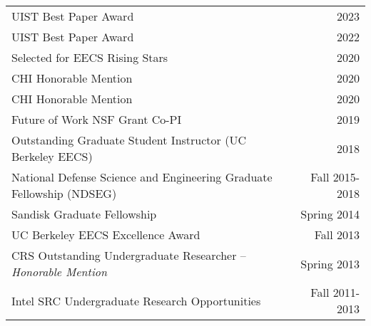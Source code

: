 \begin{longtable}{Xr}
	UIST Best Paper Award & 2023 \\
	UIST Best Paper Award & 2022 \\
	Selected for EECS Rising Stars & 2020 \\
	CHI Honorable Mention & 2020 \\
	CHI Honorable Mention & 2020 \\
	Future of Work NSF Grant Co-PI & 2019 \\
	Outstanding Graduate Student Instructor (UC Berkeley EECS) & 2018 \\
	National Defense Science and Engineering Graduate Fellowship (NDSEG) & Fall 2015-2018 \\
	Sandisk Graduate Fellowship & Spring 2014 \\
	UC Berkeley EECS Excellence Award & Fall 2013 \\
	CRS Outstanding Undergraduate Researcher -- \textit{Honorable Mention} & Spring 2013 \\
	Intel SRC Undergraduate Research Opportunities & Fall 2011-2013 \\
\end{longtable}